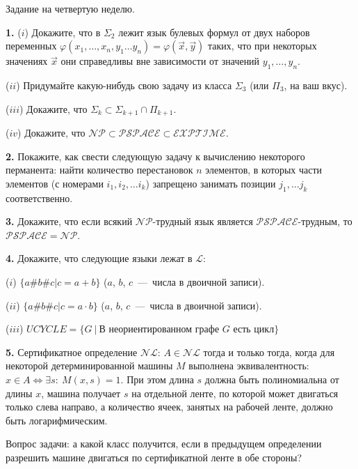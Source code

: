 \documentclass[12pt,a5paper,fleqn]{article}
\begin{document}
\begin{center}
{ \Large Задание на четвертую неделю.}

\end{center}



{\bf 1.} ($i$) Докажите, что в $\Sigma_2$ лежит язык булевых формул от двух наборов переменных $\varphi(x_1,\dotsc, x_n, y_1\dotsc y_n) = \varphi(\vec{x}, \vec{y})$ таких, что при некоторых значениях $\vec{x}$ они справедливы вне зависимости от значений $y_1,\dotsc, y_n$.

($ii$) Придумайте какую-нибудь свою задачу из класса $\Sigma_3$ (или $\Pi_3$, на ваш вкус).

($iii$) Докажите, что $\Sigma_k \subset \Sigma_{k+1}\cap \Pi_{k+1}$.

($iv$) Докажите, что $\mathcal{NP}\subset\mathcal{PSPACE}\subset\mathcal{EXPTIME}$.

\smallskip

{\bf 2.} Покажите, как свести следующую задачу к вычислению некоторого перманента: найти количество перестановок $n$ элементов, в которых части элементов (с номерами $i_1, i_2,\dotsc i_k$) запрещено занимать позиции $j_1, \dotsc j_k$ соответственно.

\smallskip

{\bf 3.} Докажите, что если всякий $\mathcal{NP}$-трудный язык является $\mathcal{PSPACE}$-трудным, то $\mathcal{PSPACE} = \mathcal{NP}$.

\smallskip

{\bf 4.} Докажите, что следующие языки лежат в $\mathcal{L}$: 

($i$) $\{a\#b\#c|c=a+b\}$ ($a$, $b$, $c$~---~числа в двоичной записи).

($ii$) $\{a\#b\#c|c=a\cdot b\}$ ($a$, $b$, $c$~---~числа в двоичной записи).

($iii$) $UCYCLE = \{G  \ | \ \mbox{В неориентированном графе $G$ есть цикл}\}$

\smallskip

{\bf 5.} Сертификатное определение $\mathcal{NL}$: $A \in \mathcal{NL}$ тогда и только тогда, когда для некоторой детерминированной машины $M$ выполнена эквивалентность: $x \in A \Leftrightarrow \exists s : \ M(x, s) = 1$. При этом длина $s$ должна быть полиномиальна от длины $x$, машина получает $s$ на отдельной ленте, по которой может двигаться только слева направо, а количество ячеек, занятых на рабочей ленте, должно быть логарифмическим.

Вопрос задачи: а какой класс получится, если в предыдущем определении разрешить машине двигаться по сертификатной ленте в обе стороны?
\end{document}
